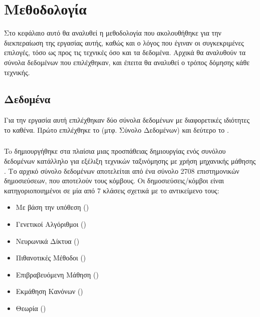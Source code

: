 \chapter{Μεθοδολογία}

Στο κεφάλαιο αυτό θα αναλυθεί η μεθοδολογία που ακολουθήθηκε για την διεκπεραίωση της εργασίας
αυτής, καθώς και ο λόγος που έγιναν οι συγκεκριμένες επιλογές, τόσο ως προς τις τεχνικές
όσο και τα δεδομένα. Αρχικά θα αναλυθούν τα σύνολα δεδομένων που επιλέχθηκαν, και έπειτα
θα αναλυθεί ο τρόπος δόμησης κάθε τεχνικής.

\section{Δεδομένα}

Για την εργασία αυτή επιλέχθηκαν δύο σύνολα δεδομένων με διαφορετικές ιδιότητες το καθένα. Πρώτο
επιλέχθηκε το  (μτφ. Σύνολο Δεδομένων) \cite{sen2008collective} και δεύτερο το 
 \cite{kumar2016edge} \cite{kumar2018rev2}.

\subsection{}

To  δημιουργήθηκε στα πλαίσια μιας προσπάθειας δημιουργίας ενός συνόλου
δεδομένων κατάλληλο για εξέλιξη τεχνικών ταξινόμησης με χρήση μηχανικής μάθησης
\cite{sen2008collective}. Το αρχικό σύνολο δεδομένων αποτελείται από ένα σύνολο 2708
επιστημονικών δημοσιεύσεων, που αποτελούν τους κόμβους. Οι δημοσιεύσεις/κόμβοι είναι κατηγοριοποιημένοι
σε μία από 7 κλάσεις σχετικά με το αντικείμενο τους:

\begin{itemize}
    \item Με βάση την υπόθεση ()
    \item Γενετικοί Αλγόριθμοι ()
    \item Νευρωνικά Δίκτυα ()
    \item Πιθανοτικές Μέθοδοι ()
    \item Επιβραβευόμενη Μάθηση ()
    \item Εκμάθηση Κανόνων ()
    \item Θεωρία ()
\end{itemize}

